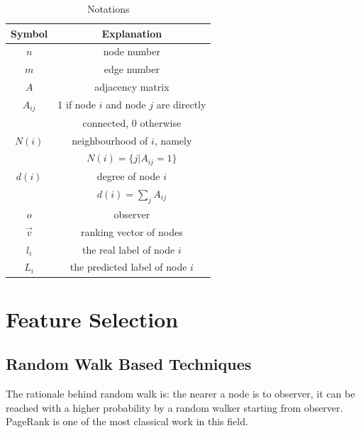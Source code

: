 \documentclass[11pt,a4paper]{article}
\begin{document}
\begin{table}[htb]
	\centering
	\caption{Notations}
	\label{tbl:notation}
	\begin{tabular}{c|c}
	\hline
	Symbol & Explanation \\
	\hline
	$n$ & node number \\
	$m$ & edge number \\
	$A$ & adjacency matrix \\
	$A_{ij}$ & 1 if node $i$ and node $j$ are directly \\
	& connected, 0 otherwise\\
	$N(i)$ & neighbourhood of $i$, namely \\
	& $N(i) = \{j | A_{ij} = 1 \}$ \\
	$d(i)$ & degree of node $i$ \\
	& $d(i) = \sum_{j}{A_{ij}}$ \\
	$o$ & observer \\
	$\overrightarrow{v}$ & ranking vector of nodes \\
	$l_i$ & the real label of node $i$ \\
	$L_i$ & the predicted label of node $i$ \\
	\hline
	\end{tabular}
\end{table}


\section{Feature Selection}

\subsection{Random Walk Based Techniques}
\label{sec:prox_pr}

The rationale behind random walk is: the nearer a node
is to observer, it can be reached with a higher probability by a random 
	walker starting from observer. PageRank is one of the most classical work 
	in this field.
\end{document}
